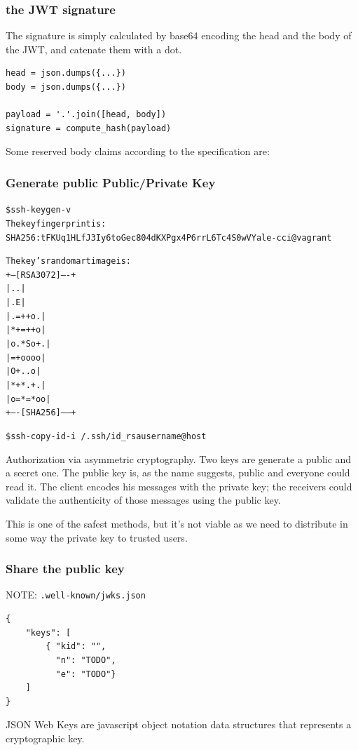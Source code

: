 \documentclass[11pt]{style}
\begin{document}
\subsubsection{the JWT signature}
The signature is simply calculated by base64 encoding the head and the body of
the JWT, and catenate them with a dot.
\begin{lstlisting}
head = json.dumps({...})
body = json.dumps({...})

payload = '.'.join([head, body])
signature = compute_hash(payload)
\end{lstlisting}

Some reserved body claims according to the specification are:

\subsubsection{Generate public Public/Private Key}
\begin{alltt}
    \$ ssh-keygen -v
    The key fingerprint is:
    SHA256:tFKUq1HLfJ3Iy6toGec804dKXPgx4P6rrL6Tc4S0wVY ale-cci@vagrant

    The key's randomart image is:
    +---[RSA 3072]----+
    |        ..       |
    |       .E        |
    |     . =++ o .   |
    |      *+=++ o    |
    |     o.*So+.     |
    |      =+oooo     |
    |       O+..o     |
    |      *+*.+ .    |
    |     o=*=*oo     |
    +----[SHA256]-----+


    \$ ssh-copy-id -i ~/.ssh/id_rsa username@host
\end{alltt}
Authorization via asymmetric cryptography. Two keys are generate a public and a secret one.
The public key is, as the name suggests, public and everyone could read it.
The client encodes his messages with the private key; the receivers could validate the authenticity of those messages using the public key.

This is one of the safest methods, but it's not viable as we need to distribute in some way the private key to
trusted users.

\subsubsection{Share the public key}
NOTE: \texttt{.well-known/jwks.json}
\begin{lstlisting}
{
    "keys": [
        { "kid": "",
          "n": "TODO",
          "e": "TODO"}
    ]
}
\end{lstlisting}

JSON Web Keys are javascript object notation data structures that represents a
cryptographic key.
\end{document}

